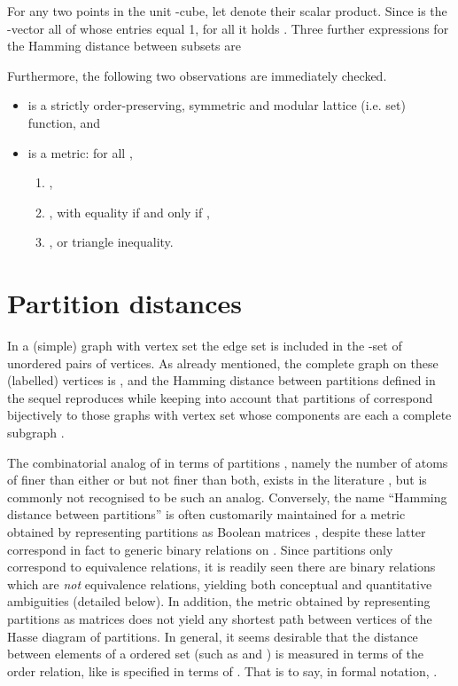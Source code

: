 \documentclass[a4paper,10pt]{article}
\begin{document}
For any two points  in the unit -cube, let  denote their scalar product. Since  is the -vector all
of whose entries equal 1, for all  it holds . Three further expressions for the Hamming distance between subsets  are



Furthermore, the following two observations are immediately checked.
\begin{itemize}
\item  is a strictly order-preserving, symmetric and modular lattice (i.e. set) function, and
\item  is a metric: for all ,
\begin{enumerate}
\item ,
\item , with equality if and only if ,
\item , or triangle inequality.
\end{enumerate}
\end{itemize}

\section{Partition distances}
In a (simple) graph  with vertex set  the edge set  is included in the -set of unordered pairs
of vertices. As already mentioned, the complete graph on these  (labelled) vertices is , and the Hamming distance  between partitions defined in the sequel
reproduces  while keeping into account that partitions of  correspond bijectively to those graphs with vertex set  whose components are each a complete subgraph
\cite{Aigner79}.

The combinatorial analog of  in terms of partitions , namely the number of atoms of  finer than either  or  but not finer than both,
exists in the literature \cite{Meila2007,Rand1971}, but is commonly not recognised to be such an analog. Conversely, the name ``Hamming distance between partitions'' is often customarily
maintained for a metric obtained by representing partitions  as Boolean matrices , despite these latter correspond in fact to generic binary relations on 
\cite[p. 393]{Mirkin1996}. Since partitions only correspond to equivalence relations, it is readily seen there are  binary relations which are \textit{not} equivalence
relations, yielding both conceptual and quantitative ambiguities (detailed below). In addition, the metric obtained by representing partitions  as matrices  does not yield any
shortest path between vertices of the Hasse diagram of partitions. In general, it seems desirable that the distance between elements of a ordered set (such as  and ) is
measured in terms of the order relation, like  is specified in terms of . That is to say, in formal notation,
.
\end{document}
